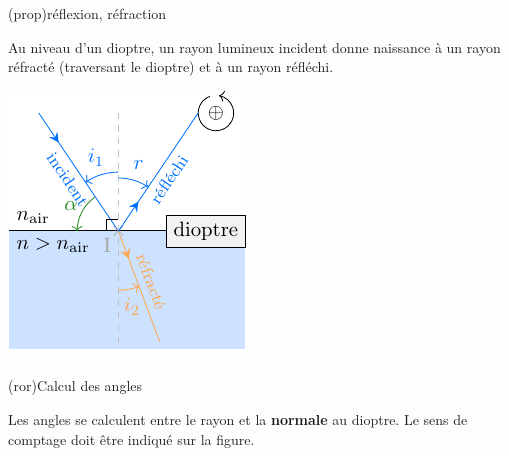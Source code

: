 \documentclass[../../main/main.tex]{subfiles}
\begin{document}
\begin{tcbraster}[raster columns=2, raster equal height=rows]
\begin{tcolorbox}[blankest, raster multicolumn=1, space to=\myspace]
\begin{tcbraster}[raster columns=1]
\begin{tcb}[label=nota:descartes]
\begin{itemize}
				\end{itemize}
			\end{tcb}
		\end{tcbraster}
	\end{tcolorbox}
	\begin{tcolorbox}[blankest, raster multicolumn=1]
		\begin{tcbraster}[raster columns=1]
			\begin{tcb}[label=prop:r_dioptre](prop){{réflexion, réfraction}}

				Au niveau d'un dioptre, un rayon lumineux incident donne
				naissance à un rayon réfracté (traversant le dioptre) et à un
				rayon réfléchi.

				\tcblower

				\begin{center}
					\includegraphics[width=.8\linewidth]{dioptre_rl.pdf}


					\label{fig:dioptre_rl}
				\end{center}

			\end{tcb}
			\begin{tcb}[label=ror:normale, valign=center](ror){Calcul des angles}

				\Huge Les angles se calculent entre le rayon et la
				\textbf{normale} au dioptre. Le sens de comptage doit être
				indiqué sur la figure.

			\end{tcb}
		\end{tcbraster}
	\end{tcolorbox}
\end{tcbraster}
\end{document}
